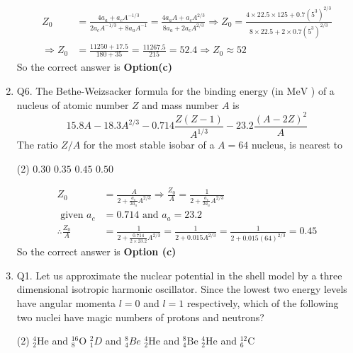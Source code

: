 \begin{enumerate}
\begin{answer}
\begin{align*}
		Z_0&=\frac{4 a_a+a_c A^{-1 / 3}}{2 a_c A^{-1 / 3}+8 a_a A^{-1}}=\frac{4 a_a A+a_c A^{2 / 3}}{8 a_a+2 a_c A^{2 / 3}} \Rightarrow Z_0=\frac{4 \times 22.5 \times 125+0.7\left(5^3\right)^{2 / 3}}{8 \times 22.5+2 \times 0.7\left(5^3\right)^{2 / 3}} \\
		\Rightarrow Z_0&=\frac{11250+17.5}{180+35}=\frac{11267.5}{215}=52.4 \Rightarrow Z_0 \approx 52
		\end{align*}
		So the correct answer is \textbf{Option(c)}
	\end{answer}
	\item Q6. The Bethe-Weizsacker formula for the binding energy (in $\mathrm{MeV}$ ) of a nucleus of atomic number $Z$ and mass number $A$ is
	$$
	15.8 A-18.3 A^{2 / 3}-0.714 \frac{Z(Z-1)}{A^{1 / 3}}-23.2 \frac{(A-2 Z)^2}{A}
	$$
	The ratio $Z / A$ for the most stable isobar of a $A=64$ nucleus, is nearest to
	\begin{tasks}(2)
		\task[\textbf{a.}]$0.30$
		\task[\textbf{b.}] $0.35$
		\task[\textbf{c.}]$0.45$
		\task[\textbf{d.}]$0.50$ 
	\end{tasks}
	\begin{answer}
		\begin{align*}
		Z_0&=\frac{A}{2+\frac{a_c}{2 a_a} A^{2 / 3}} \Rightarrow \frac{Z_0}{A}=\frac{1}{2+\frac{a_c}{2 a_a} A^{2 / 3}}\\
		\text{ given }a_c&=0.714\text{ and }a_a=23.2\\
		\therefore \frac{Z_0}{A}&=\frac{1}{2+\frac{0.714}{2 \times 23.2} A^{2 / 3}}=\frac{1}{2+0.015 A^{2 / 3}}=\frac{1}{2+0.015(64)^{2 / 3}}=0.45
		\end{align*}
		So the correct answer is \textbf{Option (c)}
	\end{answer}
	\item Q1. Let us approximate the nuclear potential in the shell model by a three dimensional isotropic harmonic oscillator. Since the lowest two energy levels have angular momenta $l=0$ and $l=1$ respectively, which of the following two nuclei have magic numbers of protons and neutrons?
	{}
	\begin{tasks}(2)
		\task[\textbf{a.}]${ }_2^4 \mathrm{He}$ and ${ }_8^{16} \mathrm{O}$
		\task[\textbf{b.}]${ }_1^2 D$ and ${ }_4^8 B e$
		\task[\textbf{c.}]${ }_2^4 \mathrm{He}$ and ${ }_4^8 \mathrm{Be}$
		\task[\textbf{d.}] ${ }_2^4 \mathrm{He}$ and ${ }_6^{12} \mathrm{C}$
	\end{tasks}
	\begin{answer}
		\begin{align*}

\end{align*}
\end{answer}
\end{enumerate}
